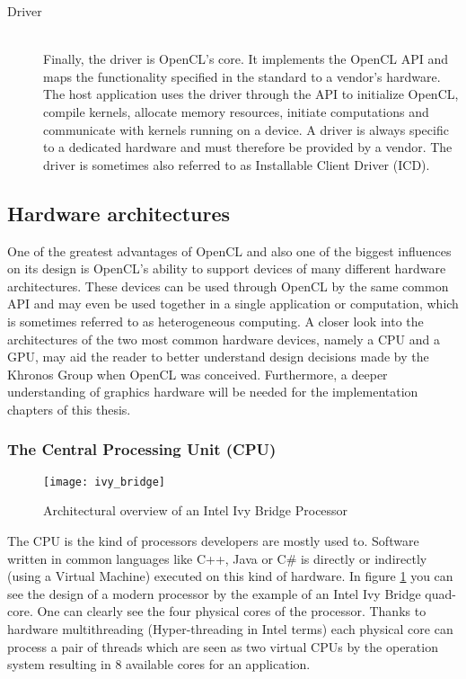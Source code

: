 \begin{description}
	\item[Driver] \hfill \\
	Finally, the driver is OpenCL's core. It implements the OpenCL API and maps the functionality specified in the standard to a vendor's hardware. The host application uses the driver through the API to initialize OpenCL, compile kernels, allocate memory resources, initiate computations and communicate with kernels running on a device. A driver is always specific to a dedicated hardware and must therefore be provided by a vendor. The driver is sometimes also referred to as Installable Client Driver (ICD).
\end{description}

\subsection{Hardware architectures}

One of the greatest advantages of OpenCL and also one of the biggest influences on its design is OpenCL's ability to support devices of many different hardware architectures. These devices can be used through OpenCL by the same common API and may even be used together in a single application or computation, which is sometimes referred to as heterogeneous computing.
A closer look into the architectures of the two most common hardware devices, namely a CPU and a GPU, may aid the reader to better understand design decisions made by the Khronos Group when OpenCL was conceived. Furthermore, a deeper understanding of graphics hardware will be needed for the implementation chapters of this thesis.

\subsubsection{The Central Processing Unit (CPU)}

\begin{figure}[h] %
\centering
\texttt{[image: ivy\_bridge]}
\caption{Architectural overview of an Intel Ivy Bridge Processor \cite{}}
\label{fig:ivy_bridge}
\end{figure}

The CPU is the kind of processors developers are mostly used to. Software written in common languages like C++, Java or C\# is directly or indirectly (using a Virtual Machine) executed on this kind of hardware.
In figure \ref{fig:ivy_bridge} you can see the design of a modern processor by the example of an Intel Ivy Bridge quad-core. One can clearly see the four physical cores of the processor. Thanks to hardware multithreading (Hyper-threading in Intel terms) each physical core can process a pair of threads which are seen as two virtual CPUs by the operation system resulting in 8 available cores for an application.

